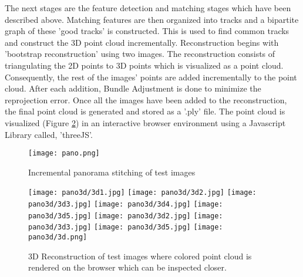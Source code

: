  The next stages are the feature detection and matching stages which have been described above. Matching features are then organized into tracks and a bipartite graph of these 'good tracks' is constructed. This is used to find common tracks and construct the 3D point cloud incrementally. Reconstruction begins with 'bootstrap reconstruction' using two images. The reconstruction consists of triangulating the 2D points to 3D points which is visualized as a point cloud. Consequently, the rest of the images' points are added incrementally to the point cloud. 
\newline
\newline
 After each addition, Bundle Adjustment is done to minimize the reprojection error. Once all the images have been added to the reconstruction, the final point cloud is generated and stored as a '.ply' file. The point cloud is visualized (Figure \ref{recon}) in an interactive browser environment using a Javascript Library called, 'threeJS'.

\begin{figure}[H]
  \centering
  \texttt{[image: pano.png]}
  \caption{Incremental panorama stitching of test images}
  \label{pano}	
\end{figure}

\begin{figure}[H]
  \centering
  \texttt{[image: pano3d/3d1.jpg]}
  \texttt{[image: pano3d/3d2.jpg]}
  \texttt{[image: pano3d/3d3.jpg]}
  \texttt{[image: pano3d/3d4.jpg]}
  \texttt{[image: pano3d/3d5.jpg]}
  \texttt{[image: pano3d/3d2.jpg]}
  \texttt{[image: pano3d/3d3.jpg]}
  \texttt{[image: pano3d/3d5.jpg]}
  \texttt{[image: pano3d/3d.png]}
  \caption{3D Reconstruction of test images where colored point cloud is rendered on the browser which can be inspected closer.}
  \label{recon}	
\end{figure}

\pagebreak

